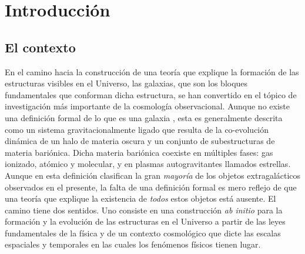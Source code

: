 \chapter{Introducción}

\label{ch:introduction}


\section{El contexto}

En el camino hacia la construcción de una teoría que explique la formación de las estructuras
visibles en el Universo, las galaxias, que son los bloques fundamentales que conforman dicha
estructura, se han convertido en el tópico de investigación más importante de la cosmología
observacional. Aunque no existe una definición formal de lo que es una galaxia
\citep[\eg][]{Forbes2011}, esta es generalmente descrita como un sistema gravitacionalmente ligado
que resulta de la co-evolución dinámica de un halo de materia oscura y un conjunto de subestructuras
de materia bariónica. Dicha materia bariónica coexiste en múltiples fases: gas ionizado, atómico y
molecular, y en plasmas autogravitantes llamados estrellas. Aunque en esta definición clasifican la
gran \emph{mayoría} de los objetos extragalácticos observados en el presente, la falta de una
definición formal es mero reflejo de que una teoría que explique la existencia de \emph{todos} estos
objetos está ausente. El camino tiene dos sentidos. Uno consiste en una construcción \emph{ab
initio} para la formación y la evolución de las estructuras en el Universo a partir de las leyes
fundamentales de la física y de un contexto cosmológico que dicte las escalas espaciales y
temporales en las cuales los fenómenos físicos tienen lugar.

